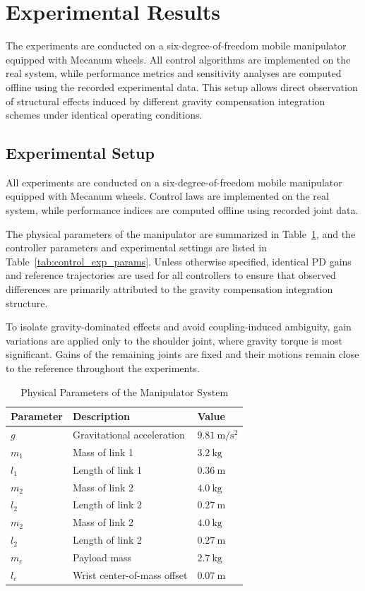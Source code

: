 \documentclass[conference]{IEEEtran}
\begin{document}
\section{Experimental Results}

The experiments are conducted on a six-degree-of-freedom mobile manipulator equipped with Mecanum wheels. All control algorithms are implemented on the real system, while performance metrics and sensitivity analyses are computed offline using the recorded experimental data. This setup allows direct observation of structural effects induced by different gravity compensation integration schemes under identical operating conditions.


\subsection{Experimental Setup}
All experiments are conducted on a six-degree-of-freedom mobile manipulator equipped with Mecanum wheels. Control laws are implemented on the real system, while performance indices are computed offline using recorded joint data.

The physical parameters of the manipulator are summarized in Table~\ref{tab:physical_params}, and the controller parameters and experimental settings are listed in Table~\ref{tab:control_exp_params}. Unless otherwise specified, identical PD gains and reference trajectories are used for all controllers to ensure that observed differences are primarily attributed to the gravity compensation integration structure.

To isolate gravity-dominated effects and avoid coupling-induced ambiguity, gain variations are applied only to the shoulder joint, where gravity torque is most significant. Gains of the remaining joints are fixed and their motions remain close to the reference throughout the experiments.


\begin{table}[t]
	\centering
	\caption{Physical Parameters of the Manipulator System}
	\label{tab:physical_params}
	\begin{tabular}{lll}
		\hline
		Parameter & Description & Value \\
		\hline
		$g$   & Gravitational acceleration & $9.81~\mathrm{m/s^2}$ \\
		$m_1$ & Mass of link 1              & $3.2~\mathrm{kg}$ \\
		$l_1$ & Length of link 1            & $0.36~\mathrm{m}$ \\
		$m_2$ & Mass of link 2              & $4.0~\mathrm{kg}$ \\
		$l_2$ & Length of link 2            & $0.27~\mathrm{m}$ \\
		$m_2$ & Mass of link 2              & $4.0~\mathrm{kg}$ \\
$l_2$ & Length of link 2            & $0.27~\mathrm{m}$ \\		
		$m_e$ & Payload mass     & $2.7~\mathrm{kg}$ \\
		$l_e$ & Wrist center-of-mass offset & $0.07~\mathrm{m}$ \\
		\hline
	\end{tabular}
\end{table}
\end{document}
